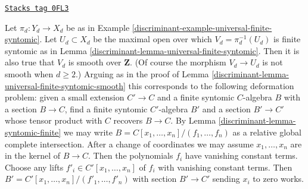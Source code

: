 \begin{remark}
\label{discriminant-remark-universal-finite-syntomic-smooth-top}
\href{https://stacks.math.columbia.edu/tag/0FL3}{\texttt{Stacks tag 0FL3}}

Let $\pi_d : Y_d \to X_d$ be as in
Example \ref{discriminant-example-universal-finite-syntomic}.
Let $U_d \subset X_d$ be the maximal open over which
$V_d = \pi_d^{-1}(U_d)$ is finite syntomic as in
Lemma \ref{discriminant-lemma-universal-finite-syntomic}.
Then it is also true that $V_d$ is smooth over $\mathbf{Z}$.
(Of course the morphism $V_d \to U_d$ is not smooth when $d \geq 2$.)
Arguing as in the proof of Lemma \ref{discriminant-lemma-universal-finite-syntomic-smooth}
this corresponds to the following deformation
problem: given a small extension $C' \to C$ and
a finite syntomic $C$-algebra $B$ with a section $B \to C$,
find a finite syntomic $C'$-algebra $B'$ and a section $B' \to C'$
whose tensor product with $C$ recovers $B \to C$.
By Lemma \ref{discriminant-lemma-syntomic-finite} we may write
$B = C[x_1, \ldots, x_n]/(f_1, \ldots, f_n)$ as
a relative global complete intersection.
After a change of coordinates we may assume
$x_1, \ldots, x_n$ are in the kernel of $B \to C$.
Then the polynomials $f_i$ have vanishing constant terms.
Choose any lifts $f'_i \in C'[x_1, \ldots, x_n]$ of $f_i$
with vanishing constant terms. Then
$B' = C'[x_1, \ldots, x_n]/(f'_1, \ldots, f'_n)$
with section $B' \to C'$ sending $x_i$ to zero works.
\end{remark}

